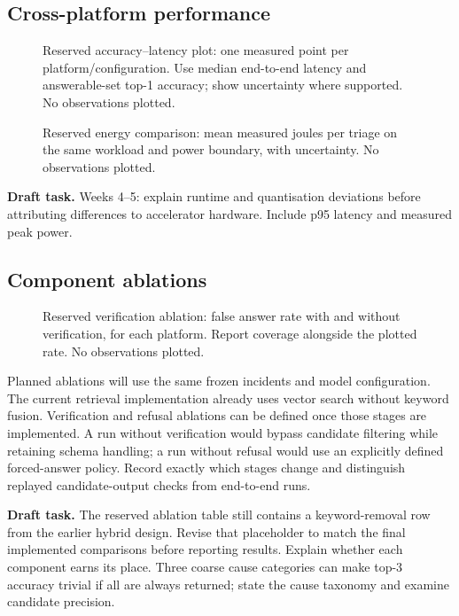 \documentclass[conference]{IEEEtran}
\newcommand{\draftnote}[1]{%
\par\smallskip\noindent
\colorbox{pale}{%
\parbox{\dimexpr\columnwidth-2\fboxsep\relax}{%
\small\textbf{Draft task.} #1}}%
\par\smallskip}
\begin{document}
\subsection{Cross-platform performance}



\begin{figure}[t]
\centering

\caption{
Reserved accuracy--latency plot: one measured point per
platform/configuration. Use median end-to-end latency and
answerable-set top-1 accuracy; show uncertainty where supported.
No observations plotted.
}
\label{fig:tradeoff}
\end{figure}

\begin{figure}[t]
\centering

\caption{
Reserved energy comparison: mean measured joules per triage
on the same workload and power boundary, with uncertainty.
No observations plotted.
}
\label{fig:energy}
\end{figure}

\draftnote{
Weeks 4--5: explain runtime and quantisation deviations before
attributing differences to accelerator hardware.
Include p95 latency and measured peak power.
}

\subsection{Component ablations}



\begin{figure}[t]
\centering

\caption{
Reserved verification ablation: false answer rate with and
without verification, for each platform. Report coverage
alongside the plotted rate. No observations plotted.
}
\label{fig:far}
\end{figure}

Planned ablations will use the same frozen incidents and model
configuration. The current retrieval implementation already uses
vector search without keyword fusion. Verification and refusal
ablations can be defined once those stages are implemented.
A run without verification would bypass candidate filtering
while retaining schema handling; a run without refusal would
use an explicitly defined forced-answer policy.
Record exactly which stages change and distinguish replayed
candidate-output checks from end-to-end runs.

\draftnote{
The reserved ablation table still contains a keyword-removal
row from the earlier hybrid design. Revise that placeholder
to match the final implemented comparisons before reporting
results. Explain whether each component earns its place.
Three coarse cause categories can make top-3 accuracy trivial
if all are always returned; state the cause taxonomy and
examine candidate precision.
}
\end{document}
